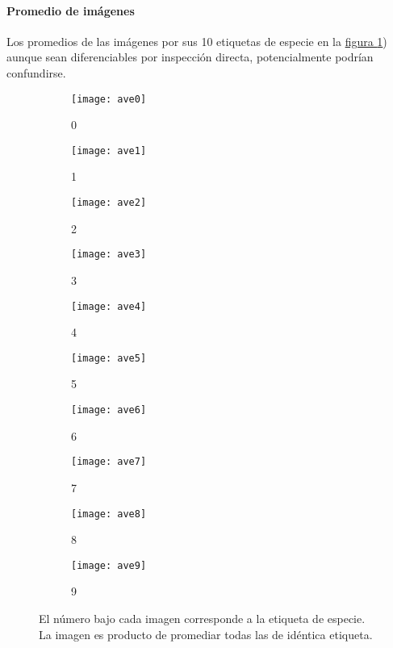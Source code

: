 \documentclass{article}
\begin{document}
\paragraph{Promedio de imágenes} Los promedios de las imágenes por sus 10 etiquetas de especie en la \hyperref[fg:promedios]{figura \ref*{fg:promedios}}) aunque sean diferenciables por inspección directa, potencialmente podrían confundirse.

\begin{figure}
	\centering
	\begin{subfigure}[b]{0.09\textwidth}
		\texttt{[image: ave0]}
		\caption{0}
	\end{subfigure}
	\begin{subfigure}[b]{0.09\textwidth}
		\texttt{[image: ave1]}
		\caption{1}
	\end{subfigure}
	\begin{subfigure}[b]{0.09\textwidth}
		\texttt{[image: ave2]}
		\caption{2}
	\end{subfigure}
	\begin{subfigure}[b]{0.09\textwidth}
		\texttt{[image: ave3]}
		\caption{3}
	\end{subfigure}
	\begin{subfigure}[b]{0.09\textwidth}
		\texttt{[image: ave4]}
		\caption{4}
	\end{subfigure}
	\begin{subfigure}[b]{0.09\textwidth}
		\texttt{[image: ave5]}
		\caption{5}
	\end{subfigure}
	\begin{subfigure}[b]{0.09\textwidth}
		\texttt{[image: ave6]}
		\caption{6}
	\end{subfigure}
	\begin{subfigure}[b]{0.09\textwidth}
		\texttt{[image: ave7]}
		\caption{7}
	\end{subfigure}
	\begin{subfigure}[b]{0.09\textwidth}
		\texttt{[image: ave8]}
		\caption{8}
	\end{subfigure}
	\begin{subfigure}[b]{0.09\textwidth}
		\texttt{[image: ave9]}
		\caption{9}
	\end{subfigure}
	\caption{El número bajo cada imagen corresponde a la etiqueta de especie. La imagen es producto de promediar todas las de idéntica etiqueta.}
	\label{fg:promedios}
\end{figure}
\end{document}
